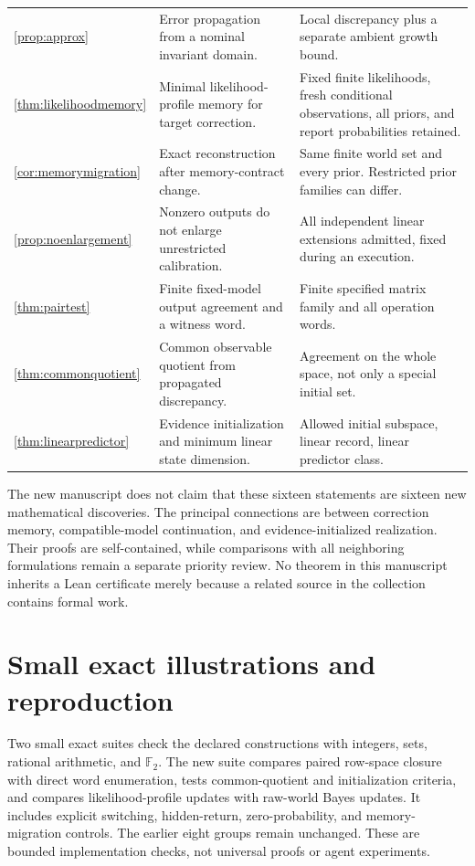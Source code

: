 \documentclass[11pt,letterpaper]{article}
\theoremstyle{plain}
\theoremstyle{definition}
\begin{document}
\begin{small}
\begin{longtable}{@{}P{.13\linewidth}P{.44\linewidth}P{.35\linewidth}@{}}
\ref{prop:approx} & Error propagation from a nominal invariant domain. & Local discrepancy plus a separate ambient growth bound.\\
\ref{thm:likelihoodmemory} & Minimal likelihood-profile memory for target correction. & Fixed finite likelihoods, fresh conditional observations, all priors, and report probabilities retained.\\
\ref{cor:memorymigration} & Exact reconstruction after memory-contract change. & Same finite world set and every prior. Restricted prior families can differ.\\
\ref{prop:noenlargement} & Nonzero outputs do not enlarge unrestricted calibration. & All independent linear extensions admitted, fixed during an execution.\\
\ref{thm:pairtest} & Finite fixed-model output agreement and a witness word. & Finite specified matrix family and all operation words.\\
\ref{thm:commonquotient} & Common observable quotient from propagated discrepancy. & Agreement on the whole space, not only a special initial set.\\
\ref{thm:linearpredictor} & Evidence initialization and minimum linear state dimension. & Allowed initial subspace, linear record, linear predictor class.\\\bottomrule
\end{longtable}\end{small}

The new manuscript does not claim that these sixteen statements are sixteen new mathematical discoveries. The principal connections are between correction memory, compatible-model continuation, and evidence-initialized realization. Their proofs are self-contained, while comparisons with all neighboring formulations remain a separate priority review. No theorem in this manuscript inherits a Lean certificate merely because a related source in the collection contains formal work.

\clearpage
\section{Small exact illustrations and reproduction}\label{app:checks}
Two small exact suites check the declared constructions with integers, sets, rational arithmetic, and $\mathbb F_2$. The new suite compares paired row-space closure with direct word enumeration, tests common-quotient and initialization criteria, and compares likelihood-profile updates with raw-world Bayes updates. It includes explicit switching, hidden-return, zero-probability, and memory-migration controls. The earlier eight groups remain unchanged. These are bounded implementation checks, not universal proofs or agent experiments.
\end{document}

